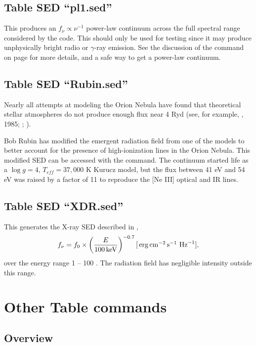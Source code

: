\subsection{Table SED ``pl1.sed''}

This produces an $f_{\nu} \propto \nu^{-1}$ power-law continuum across the
full spectral range considered by the code.
This should only be used for testing since it may produce unphysically bright 
radio or $\gamma$-ray emission.
See the discussion of the  command on page \pageref{sec:CommandPowerLaw}
for more details, and a safe way to get a power-law continuum.

\subsection{Table SED ``Rubin.sed''}

Nearly all attempts at modeling the Orion Nebula have found that
theoretical stellar atmospheres do not produce enough flux
near 4 Ryd (see,
for example, \citealp{Mathis1982}, 1985; \citealp{Rubin1991};
\citealp{Sellmaier1996}).

Bob Rubin has modified the emergent radiation field from one of the
\citet{Kurucz1979} models to better account for the presence of
high-ionization lines in the Orion Nebula.
This modified SED can be accessed with the
 command.
The continuum started life as a
$\log g = 4$, $T_{eff} = 37{,}000$
K Kurucz model, but the flux between 41 eV and 54 eV was raised
by a factor of 11 to reproduce the [Ne III] optical and IR lines.

\subsection{Table SED ``XDR.sed''}

This generates the X-ray SED described in 
\citet{Maloney1996},
\begin{equation}
f_{\nu}  = f_0 \times
\left( {\frac{{E }}{{100 {\rm\thinspace keV}}}} \right)^{-0.7} 
[\mbox{${\rm\thinspace erg}{\rm\thinspace cm}^{-2}{\rm\thinspace s}^{-1}\,$} {\rm\thinspace Hz}^{-1}] ,
\end{equation}
over the energy range 1 -- 100 \keV .
The radiation field has negligible intensity outside this range.

\section{Other Table commands}

\subsection{Overview}

